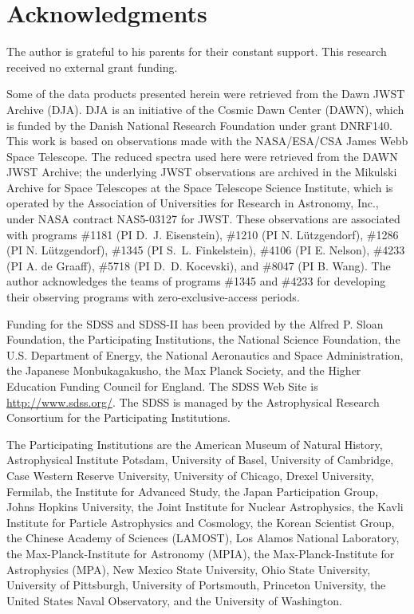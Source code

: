 \documentclass[twocolumn]{aastex631}
\begin{document}
\section*{Acknowledgments}
The author is grateful to his parents for their constant support. This research received no external grant funding.

Some of the data products presented herein were retrieved from the Dawn JWST Archive (DJA). DJA is an initiative of the Cosmic Dawn Center (DAWN), which is funded by the Danish National Research Foundation under grant DNRF140. This work is based on observations made with the NASA/ESA/CSA James Webb Space Telescope. The reduced spectra used here were retrieved from the DAWN JWST Archive; the underlying JWST observations are archived in the Mikulski Archive for Space Telescopes at the Space Telescope Science Institute, which is operated by the Association of Universities for Research in Astronomy, Inc., under NASA contract NAS5-03127 for JWST. These observations are associated with programs \#1181 (PI D.~J. Eisenstein), \#1210 (PI N. L\"utzgendorf), \#1286 (PI N. L\"utzgendorf), \#1345 (PI S.~L. Finkelstein), \#4106 (PI E. Nelson), \#4233 (PI A. de Graaff), \#5718 (PI D.~D. Kocevski), and \#8047 (PI B. Wang). The author acknowledges the teams of programs \#1345 and \#4233 for developing their observing programs with zero-exclusive-access periods.

Funding for the SDSS and SDSS-II has been provided by the Alfred P. Sloan Foundation, the Participating Institutions, the National Science Foundation, the U.S. Department of Energy, the National Aeronautics and Space Administration, the Japanese Monbukagakusho, the Max Planck Society, and the Higher Education Funding Council for England. The SDSS Web Site is \url{http://www.sdss.org/}. The SDSS is managed by the Astrophysical Research Consortium for the Participating Institutions.

The Participating Institutions are the American Museum of Natural History, Astrophysical Institute Potsdam, University of Basel, University of Cambridge, Case Western Reserve University, University of Chicago, Drexel University, Fermilab, the Institute for Advanced Study, the Japan Participation Group, Johns Hopkins University, the Joint Institute for Nuclear Astrophysics, the Kavli Institute for Particle Astrophysics and Cosmology, the Korean Scientist Group, the Chinese Academy of Sciences (LAMOST), Los Alamos National Laboratory, the Max-Planck-Institute for Astronomy (MPIA), the Max-Planck-Institute for Astrophysics (MPA), New Mexico State University, Ohio State University, University of Pittsburgh, University of Portsmouth, Princeton University, the United States Naval Observatory, and the University of Washington.
\end{document}
